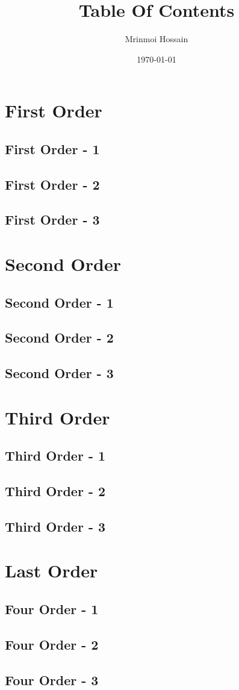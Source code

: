 \documentclass[11pt]{article}
\begin{document}
\title{Table Of Contents}
\author{Mrinmoi Hossain}
\date{\today}
\maketitle

\tableofcontents

\section{First Order}
	\subsection{First Order - 1}
	\subsection{First Order - 2}
	\subsection{First Order - 3}
\section{Second Order}
	\subsection{Second Order - 1}
	\subsection{Second Order - 2}
	\subsection{Second Order - 3}
\section{Third Order}
	\subsection{Third Order - 1}
	\subsection{Third Order - 2}
	\subsection{Third Order - 3}
\section{Last Order}
	\subsection{Four Order - 1}
	\subsection{Four Order - 2}
	\subsection{Four Order - 3}
\end{document}
